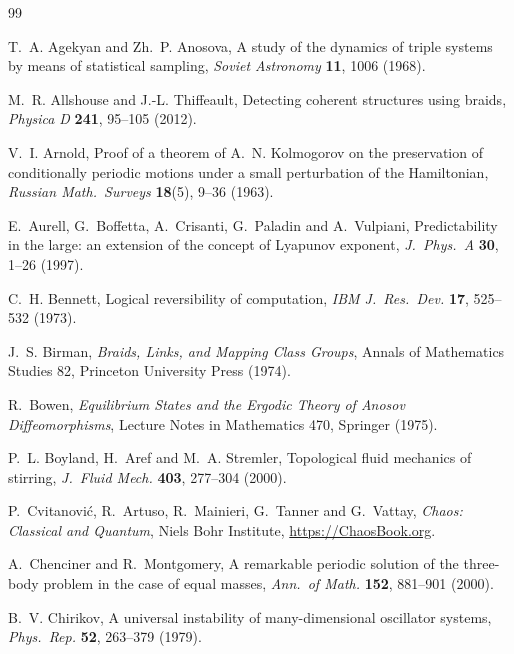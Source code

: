 \documentclass[11pt]{article}
\theoremstyle{remark}
\begin{document}
\begin{thebibliography}{99}

 T.~A. Agekyan and Zh.~P. Anosova, A study of the dynamics of triple systems by
means of statistical sampling, \emph{Soviet Astronomy} \textbf{11}, 1006 (1968).

 M.~R. Allshouse and J.-L. Thiffeault, Detecting coherent structures using
braids, \emph{Physica D} \textbf{241}, 95--105 (2012).

 V.~I. Arnold, Proof of a theorem of A.~N. Kolmogorov on the preservation of
conditionally periodic motions under a small perturbation of the Hamiltonian, \emph{Russian Math.\ Surveys}
\textbf{18}(5), 9--36 (1963).

 E.~Aurell, G.~Boffetta, A.~Crisanti, G.~Paladin and A.~Vulpiani, Predictability in the
large: an extension of the concept of Lyapunov exponent, \emph{J.\ Phys.\ A} \textbf{30}, 1--26 (1997).

 C.~H. Bennett, Logical reversibility of computation, \emph{IBM J.\ Res.\ Dev.}
\textbf{17}, 525--532 (1973).

 J.~S. Birman, \emph{Braids, Links, and Mapping Class Groups}, Annals of Mathematics
Studies 82, Princeton University Press (1974).

 R.~Bowen, \emph{Equilibrium States and the Ergodic Theory of Anosov Diffeomorphisms},
Lecture Notes in Mathematics 470, Springer (1975).

 P.~L. Boyland, H.~Aref and M.~A. Stremler, Topological fluid mechanics of
stirring, \emph{J.\ Fluid Mech.} \textbf{403}, 277--304 (2000).

 P.~Cvitanovi\'c, R.~Artuso, R.~Mainieri, G.~Tanner and G.~Vattay, \emph{Chaos: Classical
and Quantum}, Niels Bohr Institute, \url{https://ChaosBook.org}.

 A.~Chenciner and R.~Montgomery, A remarkable periodic solution of the
three-body problem in the case of equal masses, \emph{Ann.\ of Math.} \textbf{152}, 881--901 (2000).

 B.~V. Chirikov, A universal instability of many-dimensional oscillator systems,
\emph{Phys.\ Rep.} \textbf{52}, 263--379 (1979).


\end{thebibliography}
\end{document}
